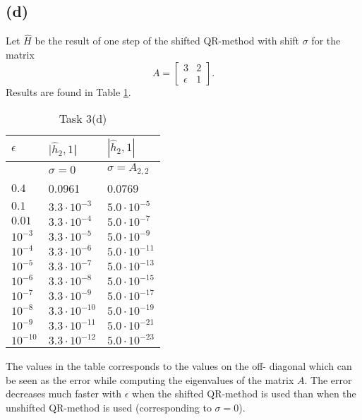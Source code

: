 \subsection*{(d)}
Let $\hat{H}$ be the result of one step of the shifted QR-method with shift $\sigma$ for the matrix
\begin{equation}
A = 
\begin{bmatrix}
3 & 2\\ \epsilon & 1
\end{bmatrix}.
\end{equation}
Results are found in Table \ref{task3d}.

\begin{table}[h!]
	\centering
	\caption{Task 3(d)}
	\label{task3d}
	\begin{tabular}{l | l | l }
	$\epsilon$	& $|\hat{h}_2,1$| & $|\hat{h}_2,1|$\\ \hline
	& $\sigma = 0$ & $\sigma = A_{2,2}$\\ \hline \hline
		$0.4$ & 0.0961 & 0.0769 \\ \hline
		$0.1$ & $3.3\cdot 10^{-3}$ & $ 5.0\cdot 10^{-5}$\\  \hline
		$0.01$ & $3.3\cdot 10^{-4}$ & $ 5.0\cdot 10^{-7}$\\  \hline
		$10^{-3}$ & $3.3\cdot 10^{-5}$ &$ 5.0\cdot 10^{-9}$\\  \hline
		$10^{-4}$ & $3.3\cdot 10^{-6}$ & $ 5.0\cdot 10^{-11}$\\  \hline
		$10^{-5}$ & $3.3\cdot 10^{-7}$ & $ 5.0\cdot 10^{-13}$\\  \hline
		$10^{-6}$ & $3.3\cdot 10^{-8}$ & $ 5.0\cdot 10^{-15}$\\  \hline
		$10^{-7}$ & $3.3\cdot 10^{-9}$ & $ 5.0\cdot 10^{-17}$\\  \hline
		$10^{-8}$ & $3.3\cdot 10^{-10}$ & $ 5.0\cdot 10^{-19}$\\  \hline
		$10^{-9}$ & $3.3\cdot 10^{-11}$ & $ 5.0\cdot 10^{-21}$\\  \hline
		$10^{-10}$ & $3.3\cdot 10^{-12}$ & $ 5.0\cdot 10^{-23}$\\  \hline
	\end{tabular}
\end{table}
The values in the table corresponds to the values on the off- diagonal which can be seen as the error while computing the eigenvalues of the matrix $A$. The error decreases much faster with $\epsilon$ when the shifted QR-method is used than when the unshifted QR-method is used (corresponding to $\sigma = 0$). 


		
		